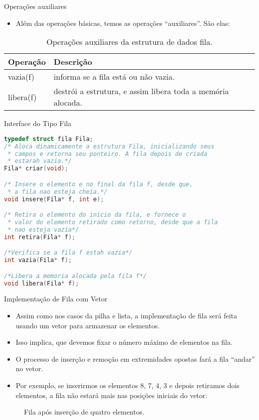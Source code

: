 \begin{frame}{Operações auxiliares}   
			\begin{itemize}
				\item Além das operações básicas, temos as operações ``auxiliares''. São elas:
			\end{itemize}
			\begin{table}[ht]
			  \centering
						\begin{tabular}{l|l}
						    \hline \textbf{Operação} & \textbf{Descrição} \\						    
						    \hline vazia(f) & informa se a fila está ou não vazia.\\
						    \hline libera(f) & destrói a estrutura, e assim libera toda a memória alocada.\\
						    \hline 
						\end{tabular}
						\caption{Operações auxiliares da estrutura de dados fila.}
				\end{table}
  \end{frame}


\begin{frame}{Interface do Tipo Fila}
\footnotesize
\begin{lstlisting}[language=C]
typedef struct fila Fila;
/* Aloca dinamicamente a estrutura Fila, inicializando seus
 * campos e retorna seu ponteiro. A fila depois de criada
 * estarah vazia.*/
Fila* criar(void);

/* Insere o elemento e no final da fila f, desde que,
 * a fila nao esteja cheia.*/
void insere(Fila* f, int e);

/* Retira o elemento do inicio da fila, e fornece o 
 * valor do elemento retirado como retorno, desde que a fila
 * nao esteja vazia*/
int retira(Fila* f);

/*Verifica se a fila f estah vazia*/
int vazia(Fila* f);

/*Libera a memoria alocada pela fila f*/
void libera(Fila* f);
\end{lstlisting}
\end{frame}

\begin{frame}{Implementação de Fila com Vetor}
	\begin{itemize}
		\item Assim como nos casos da pilha e lista, a implementação de fila será feita usando um vetor para armazenar os elementos.
		\item Isso implica, que devemos fixar o número máximo de elementos na fila.
		\item O processo de inserção e remoção em extremidades opostas fará a fila ``andar'' no vetor.
		\item Por exemplo, se inserirmos os elementos 8, 7, 4, 3 e depois retiramos dois elementos, a fila não estará mais nas posições iniciais do vetor.
	\end{itemize}
	\begin{figure}[ht]
				\centering
				\caption{Fila após inserção de quatro elementos.}	
	\end{figure} 	
\end{frame}

